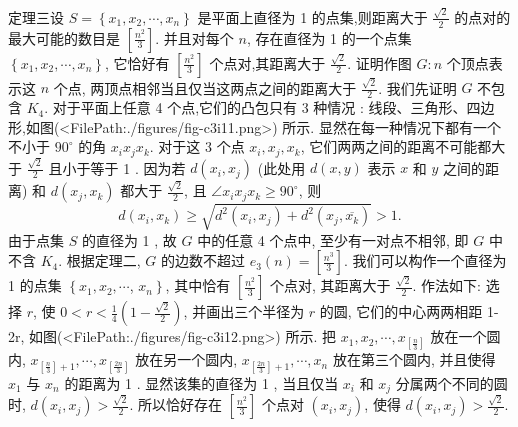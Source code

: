 定理三设 $S=\left\{x_1, x_2, \cdots, x_n\right\}$ 是平面上直径为 1 的点集,则距离大于 $\frac{\sqrt{2}}{2}$ 的点对的最大可能的数目是 $\left[\frac{n^2}{3}\right]$. 并且对每个 $n$, 存在直径为 1 的一个点集 $\left\{x_1, x_2, \cdots, x_n\right\}$, 它恰好有 $\left[\frac{n^2}{3}\right]$ 个点对,其距离大于 $\frac{\sqrt{2}}{2}$.
证明作图 $G: n$ 个顶点表示这 $n$ 个点, 两顶点相邻当且仅当这两点之间的距离大于 $\frac{\sqrt{2}}{2}$. 我们先证明 $G$ 不包含 $K_4$.
对于平面上任意 4 个点,它们的凸包只有 3 种情况 : 线段、三角形、四边形,如图(<FilePath:./figures/fig-c3i11.png>) 所示.
显然在每一种情况下都有一个不小于 $90^{\circ}$ 的角 $x_i x_j x_k$. 对于这 3 个点 $x_i, x_j, x_k$, 它们两两之间的距离不可能都大于 $\frac{\sqrt{2}}{2}$ 且小于等于 1 .
因为若 $d\left(x_i, x_j\right)$ (此处用 $d(x, y)$ 表示 $x$ 和 $y$ 之间的距离) 和 $d\left(x_j, x_k\right)$ 都大于 $\frac{\sqrt{2}}{2}$, 且 $\angle x_i x_j x_k \geqslant 90^{\circ}$, 则
$$
d\left(x_i, x_k\right) \geqslant \sqrt{d^2\left(x_i, x_j\right)+d^2\left(x_j, \overline{x_k}\right)}>1 .
$$
由于点集 $S$ 的直径为 1 , 故 $G$ 中的任意 4 个点中, 至少有一对点不相邻, 即 $G$ 中不含 $K_4$.
根据定理二, $G$ 的边数不超过 $e_3(n)=\left[\frac{n^3}{3}\right]$.
我们可以构作一个直径为 1 的点集 $\left\{x_1, x_2, \cdots\right.$, $\left.x_n\right\}$, 其中恰有 $\left[\frac{n^2}{3}\right]$ 个点对, 其距离大于 $\frac{\sqrt{2}}{2}$. 作法如下: 选择 $r$, 使 $0<r<\frac{1}{4}\left(1-\frac{\sqrt{2}}{2}\right)$, 并画出三个半径为 $r$ 的圆, 它们的中心两两相距 1-2r, 如图(<FilePath:./figures/fig-c3i12.png>) 所示.
把 $x_1, x_2, \cdots, x_{\left[\frac{n}{3}\right]}$ 放在一个圆内, $x_{\left[\frac{n}{3}\right]+1}, \cdots, x_{\left[\frac{2 n}{3}\right]}$ 放在另一个圆内, $x_{\left[\frac{2 n}{3}\right]+1}, \cdots, x_n$ 放在第三个圆内, 并且使得 $x_1$ 与 $x_n$ 的距离为 1 . 显然该集的直径为 1 , 当且仅当 $x_i$ 和 $x_j$ 分属两个不同的圆时, $d\left(x_i, x_j\right)>\frac{\sqrt{2}}{2}$. 所以恰好存在 $\left[\frac{n^2}{3}\right]$ 个点对 $\left(x_i, x_j\right)$, 使得 $d\left(x_i, x_j\right)>\frac{\sqrt{2}}{2}$.



